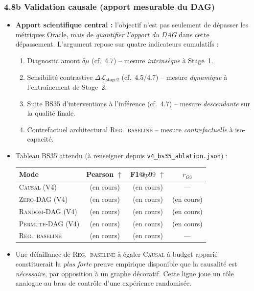\documentclass[12pt,a4paper]{article}
\begin{document}
\subsubsection*{4.8b Validation causale (apport mesurable du DAG)}
\begin{itemize}
    \item \textbf{Apport scientifique central :} l'objectif n'est pas seulement de d\'epasser les m\'etriques Oracle, mais de \emph{quantifier l'apport du DAG} dans cette d\'epassement. L'argument repose sur quatre indicateurs cumulatifs :
    \begin{enumerate}
        \item Diagnostic amont $\delta\mu$ (cf.\ 4.7) -- mesure \emph{intrins\`eque} \`a Stage~1.
        \item Sensibilit\'e contrastive $\Delta\mathcal{L}_{\text{stage2}}$ (cf.\ 4.5/4.7) -- mesure \emph{dynamique} \`a l'entra\^inement de Stage~2.
        \item Suite BS35 d'interventions \`a l'inf\'erence (cf.\ 4.7) -- mesure \emph{descendante} sur la qualit\'e finale.
        \item Contrefactuel architectural \textsc{Reg.\ baseline} -- mesure \emph{contrefactuelle} \`a iso-capacit\'e.
    \end{enumerate}
    \item Tableau BS35 attendu (\`a renseigner depuis \texttt{v4\_bs35\_ablation.json}) :

\begin{center}
\small
\begin{tabular}{lccc}
\hline
Mode                       & Pearson $\uparrow$ & F1@$p99$ $\uparrow$ & $r_{O3}$ \\
\hline
\textsc{Causal} (V4)       & (en cours) & (en cours) & --- \\
\textsc{Zero-DAG} (V4)     & (en cours) & (en cours) & (en cours) \\
\textsc{Random-DAG} (V4)   & (en cours) & (en cours) & (en cours) \\
\textsc{Permute-DAG} (V4)  & (en cours) & (en cours) & (en cours) \\
\textsc{Reg.\ baseline}    & (en cours) & (en cours) & --- \\
\hline
\end{tabular}
\end{center}
    \item Une d\'efaillance de \textsc{Reg.\ baseline} \`a \'egaler \textsc{Causal} \`a budget appari\'e constituerait la \emph{plus forte} preuve empirique disponible que la causalit\'e est \emph{n\'ecessaire}, par opposition \`a un graphe d\'ecoratif. Cette ligne joue un r\^ole analogue au bras de contr\^ole d'une exp\'erience randomis\'ee.
\end{itemize}
\end{document}
